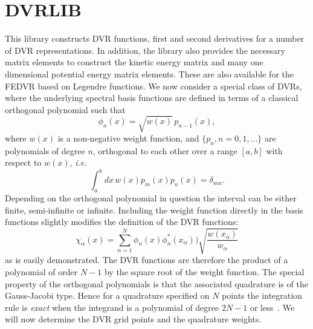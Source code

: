 \documentclass[onecolumn,letterpaper]{report}
\newcommand{\ie}{\emph{i.e.} }
\begin{document}
\section{DVRLIB}
This library constructs DVR functions, first and second derivatives for a number of DVR
representations.  In addition, the library also provides the necessary matrix elements
to construct the kinetic energy matrix and many one dimensional potential energy matrix elements.
These are also available for the FEDVR based on Legendre functions.  We now consider a special 
class of DVRs, where the underlying spectral basis functions are defined in terms of a 
classical orthogonal polynomial such that
\begin{equation}
\phi_n(x) = \sqrt{w(x)} \, p_{n-1}(x),
\label{basisfcts}
\end{equation}
where $w(x)$ is a non-negative weight function, and
$\{p_n,n=0,1,\ldots \}$ are polynomials of degree $n$, orthogonal to
each other over a range $[a,b]$ with respect to $w(x)$, \ie
\begin{equation}
\int_a^b dx \, w(x) p_m(x) p_n(x) = \delta_{mn}.
\end{equation}
Depending on the orthogonal polynomial in question the interval can be
either finite, semi-infinite or infinite. Including the weight function
directly in the basis functions slightly modifies the definition of
the DVR functions:
\begin{equation}
\chi_{\alpha} (x) = \sum_{n=1}^N  \phi_n(x) \phi^*_n (x_\alpha)) 
\sqrt { \frac{ w(x_\alpha)}{ w_\alpha }  }
\label{basis}
\end{equation}
as is easily demonstrated.
The DVR functions are therefore the product of a polynomial of order
$N-1$ by the square root of the weight function. 
The special property of the orthogonal polynomials is that the
associated quadrature is of the Gauss-Jacobi type. Hence for a
quadrature specified on $N$ points the integration rule
is {\emph{exact}} when the integrand is a polynomial
of degree $2N-1$ or less~\cite{koonin1990,Gabor1939}. 
We will now determine the DVR grid points and the quadrature weights. 
\end{document}
